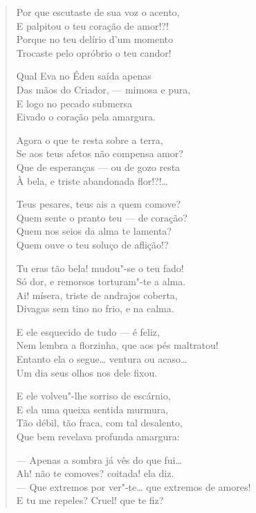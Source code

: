 \begin{verse}
\pagebreak

Por que escutaste de sua voz o acento,\\
E palpitou o teu coração de amor!?!\\
Porque no teu delírio d'um momento\\
Trocaste pelo opróbrio o teu candor!

Qual Eva no Éden saída apenas\\
Das mãos do Criador, --- mimosa e pura,\\
E logo no pecado submersa\\
Eivado o coração pela amargura.

Agora o que te resta sobre a terra,\\
Se aos teus afetos não compensa amor?\\
Que de esperanças --- ou de gozo resta\\
À bela, e triste abandonada flor!?!\ldots{}

Teus pesares, teus ais a quem comove?\\
Quem sente o pranto teu --- de coração?\\
Quem nos seios da alma te lamenta?\\
Quem ouve o teu soluço de aflição!?

Tu eras tão bela! mudou"-se o teu fado!\\
Só dor, e remorsos torturam"-te a alma.\\
Ai! mísera, triste de andrajos coberta,\\
Divagas sem tino no frio, e na calma.

E ele esquecido de tudo --- é feliz,\\
Nem lembra a florzinha, que aos pés maltratou!\\
Entanto ela o segue\ldots{} ventura ou acaso\ldots{}\\
Um dia seus olhos nos dele fixou.

E ele volveu"-lhe sorriso de escárnio,\\
E ela uma queixa sentida murmura,\\
Tão débil, tão fraca, com tal desalento,\\
Que bem revelava profunda amargura:

--- Apenas a sombra já vês do que fui\ldots{}\\
Ah! não te comoves? coitada! ela diz.\\
--- Que extremos por ver"-te\ldots{} que extremos \qb{}de amores!\\
E tu me repeles? Cruel! que te fiz?


\end{verse}
